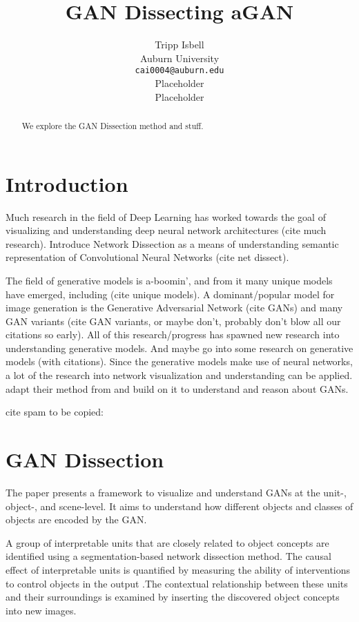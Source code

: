 \documentclass{article}
\title{GAN Dissecting aGAN}
\author{%
  Tripp Isbell\\
  Auburn University\\
  \texttt{cai0004@auburn.edu} \\
  \And
  Placeholder \\
  \And
  Placeholder \\
}
\begin{document}
\maketitle

\begin{abstract}
We explore the GAN Dissection method and stuff.
\end{abstract}

\section{Introduction}


Much research in the field of Deep Learning has worked towards the goal of visualizing and understanding deep neural network architectures (cite much research). Introduce Network Dissection as a means of understanding semantic representation of Convolutional Neural Networks (cite net dissect). 

The field of generative models is a-boomin', and from it many unique models have emerged, including (cite unique models). A dominant/popular model for image generation is the Generative Adversarial Network (cite GANs) and many GAN variants (cite GAN variants, or maybe don't, probably don't blow all our citations so early). All of this research/progress has spawned new research into understanding generative models. And maybe go into some research on generative models (with citations). Since the generative models make use of neural networks, a lot of the research into network visualization and understanding can be applied. \citet{gandissect2019} adapt their method from \cite{netdissect2017} and build on it to understand and reason about GANs. 

cite spam to be copied:
\citet{netdissect2017}
\citet{gandissect2019}
\citet{progan2017}
\citet{stylegan2018}
\citet{gan2014}
\citet{synthesizing2016}
\citet{deepvis2015}

\section{GAN Dissection}

The paper presents a framework to visualize and understand GANs at the unit-, object-, and scene-level. It aims to understand how different objects and classes of objects are encoded by the GAN.

 A group of interpretable units that are closely related to object concepts are identified using a segmentation-based network dissection method. The causal effect of interpretable units is quantified by measuring the ability of interventions to control objects in the output .The contextual relationship between these units and their surroundings is examined by inserting the discovered object concepts into new images.
\end{document}
